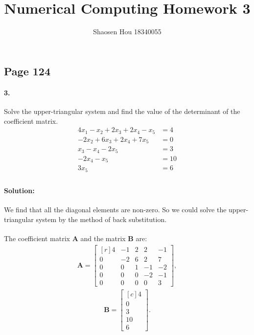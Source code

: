 \documentclass{article}  %
\title{Numerical Computing Homework 3}
\author{Shaosen Hou 18340055}
\begin{document}
 
    \maketitle
        \subsection*{Page 124} 
        \paragraph{3.}Solve the upper-triangular system and find the value of the determinant of the coefficient matrix.
        \begin{align*}
            4x_1 - x_2 + 2x_3 + 2x_4 - x_5 &= 4 \\
            -2x_2 + 6x_3 + 2x_4 + 7x_5 &= 0 \\
            x_3 - x_4 - 2x_5 &= 3 \\
            -2x_4 - x_5 &= 10 \\
            3x_5 &= 6 \\
        \end{align*}
        \paragraph{Solution:}
        \paragraph{}We find that all the diagonal elements are non-zero. So we could solve the upper-triangular system by the method of back substitution.
        \paragraph{}The coefficient matrix $\mathbf{A}$ and the matrix $\mathbf{B}$ are: 
        \begin{align*}
            \mathbf{A} =  \begin{bmatrix*}[r]
                4 & -1 & 2 & 2 & -1 \\
                0 & -2 & 6 & 2 & 7 \\
                0 & 0 & 1 & -1 & -2 \\
                0 & 0 & 0 & -2 & -1 \\
                0 & 0 & 0 & 0 & 3 
            \end{bmatrix*},
        \end{align*}
        \begin{align*}
            \mathbf{B} =  \begin{bmatrix*}[c]
                4 \\
                0 \\
                3 \\
                10 \\
                6  
            \end{bmatrix*}.
        \end{align*}
\end{document}
